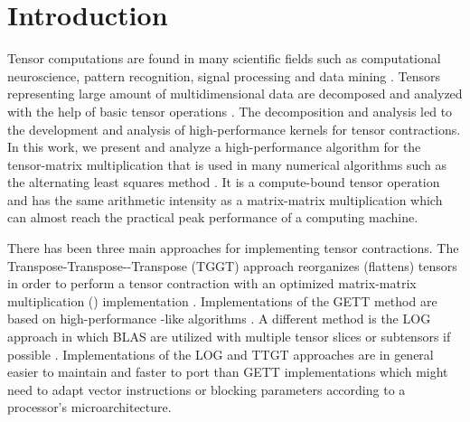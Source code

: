 \section{Introduction}
\label{sec:introduction}
Tensor computations are found in many scientific fields such as computational neuroscience, pattern recognition, signal processing and data mining \cite{karahan:2015:tensor, papalexakis:2017:tensors}.
Tensors representing large amount of multidimensional data are decomposed and analyzed with the help of basic tensor operations \cite{lee:2018:fundamental, kolda:2009:decompositions}. 
The decomposition and analysis led to the development and analysis of high-performance kernels for tensor contractions.
In this work, we present and analyze a high-performance algorithm for the tensor-matrix multiplication that is used in many numerical algorithms such as the alternating least squares method \cite{lee:2018:fundamental, kolda:2009:decompositions}.
It is a compute-bound tensor operation and has the same arithmetic intensity as a matrix-matrix multiplication which can almost reach the practical peak performance of a computing machine.

There has been three main approaches for implementing tensor contractions.
The Transpose-Transpose--Transpose (TGGT) approach reorganizes (flattens) tensors in order to perform a tensor contraction with an optimized matrix-matrix multiplication () implementation \cite{bader:2006:algorithm862, solomonik:2013:cyclops}.
Implementations of the GETT method are based on high-performance -like algorithms \cite{springer:2018:design, matthews:2018:high}.
A different method is the LOG approach in which BLAS are utilized with multiple tensor slices or subtensors if possible \cite{dinapoli:2014:towards.efficient.use, li:2015:input, shi:2016:tensor.contraction}.
Implementations of the LOG and TTGT approaches are in general easier to maintain and faster to port than GETT implementations which might need to adapt vector instructions or blocking parameters according to a processor's microarchitecture.

